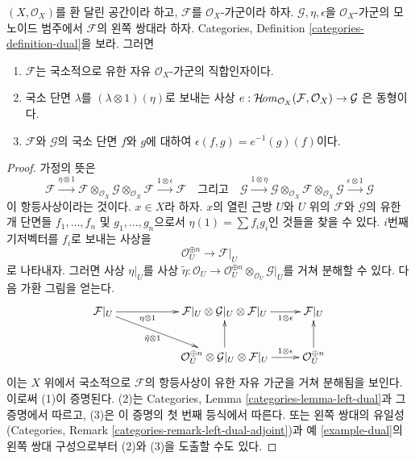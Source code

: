 \begin{lemma}
\label{lemma-left-dual-module}
$(X, \mathcal{O}_X)$를 환 달린 공간이라 하고, $\mathcal{F}$를
$\mathcal{O}_X$-가군이라 하자. $\mathcal{G}, \eta, \epsilon$을
$\mathcal{O}_X$-가군의 모노이드 범주에서 $\mathcal{F}$의 왼쪽 쌍대라 하자.
Categories, Definition \ref{categories-definition-dual}을 보라. 그러면
\begin{enumerate}
\item $\mathcal{F}$는 국소적으로 유한 자유 $\mathcal{O}_X$-가군의
직합인자이다.
\item 국소 단면 $\lambda$를 $(\lambda \otimes 1)(\eta)$로 보내는 사상
$e : \mathop{\mathcal{H}\!\mathit{om}}\nolimits_{\mathcal{O}_X}(\mathcal{F}, \mathcal{O}_X) \to \mathcal{G}$
은 동형이다.
\item $\mathcal{F}$와 $\mathcal{G}$의 국소 단면 $f$와 $g$에 대하여
$\epsilon(f, g) = e^{-1}(g)(f)$이다.
\end{enumerate}
\end{lemma}

\begin{proof}
가정의 뜻은
$$
\mathcal{F} \xrightarrow{\eta \otimes 1}
\mathcal{F} \otimes_{\mathcal{O}_X} \mathcal{G}
\otimes_{\mathcal{O}_X} \mathcal{F}
\xrightarrow{1 \otimes \epsilon} \mathcal{F}
\quad\text{그리고}\quad
\mathcal{G} \xrightarrow{1 \otimes \eta}
\mathcal{G} \otimes_{\mathcal{O}_X} \mathcal{F}
\otimes_{\mathcal{O}_X} \mathcal{G}
\xrightarrow{\epsilon \otimes 1} \mathcal{G}
$$
이 항등사상이라는 것이다. $x \in X$라 하자. $x$의 열린 근방 $U$와
$U$ 위의 $\mathcal{F}$와 $\mathcal{G}$의 유한 개 단면들
$f_1, \ldots, f_n$ 및 $g_1, \ldots, g_n$으로서
$\eta(1) = \sum f_i g_i$인 것들을 찾을 수 있다. $i$번째 기저벡터를
$f_i$로 보내는 사상을
$$
\mathcal{O}_U^{\oplus n} \to \mathcal{F}|_U
$$
로 나타내자. 그러면 사상 $\eta|_U$를 사상
$\tilde \eta : \mathcal{O}_U \to
\mathcal{O}_U^{\oplus n} \otimes_{\mathcal{O}_U} \mathcal{G}|_U$를
거쳐 분해할 수 있다. 다음 가환 그림을 얻는다.
$$
\xymatrix{
\mathcal{F}|_U
\ar[rr]_-{\eta \otimes 1} \ar[rrd]_-{\tilde \eta \otimes 1} & &
\mathcal{F}|_U \otimes \mathcal{G}|_U \otimes \mathcal{F}|_U
\ar[r]_-{1 \otimes \epsilon} &
\mathcal{F}|_U \\
& &
\mathcal{O}_U^{\oplus n} \otimes \mathcal{G}|_U \otimes \mathcal{F}|_U
\ar[u] \ar[r]^-{1 \otimes \epsilon} &
\mathcal{O}_U^{\oplus n} \ar[u]
}
$$
이는 $X$ 위에서 국소적으로 $\mathcal{F}$의 항등사상이 유한 자유 가군을
거쳐 분해됨을 보인다. 이로써 (1)이 증명된다. (2)는 Categories, Lemma
\ref{categories-lemma-left-dual}과 그 증명에서 따르고, (3)은 이 증명의
첫 번째 등식에서 따른다. 또는 왼쪽 쌍대의 유일성(Categories, Remark
\ref{categories-remark-left-dual-adjoint})과 예 \ref{example-dual}의
왼쪽 쌍대 구성으로부터 (2)와 (3)을 도출할 수도 있다.
\end{proof}

